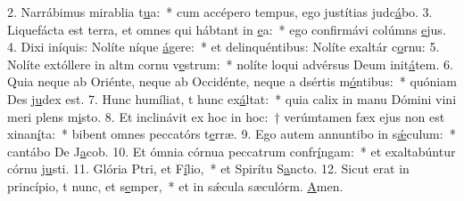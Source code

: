 2. Narrábimus mirablia t\uline{u}a:~* cum accépero tempus, ego justítias judc\uline{á}bo.
3. Liquefácta est terra, et omnes qui hábtant in \uline{e}a:~* ego confirmávi colúmns \uline{e}jus.
4. Dixi iníquis: Nolíte níque \uline{á}gere:~* et delinquéntibus: Nolíte exaltár c\uline{o}rnu:
5. Nolíte extóllere in altm cornu v\uline{e}strum:~* nolíte loqui advérsus Deum init\uline{á}tem.
6. Quia neque ab Oriénte, neque ab Occidénte, neque a dsértis m\uline{ó}ntibus:~* quóniam Des j\uline{u}dex est.
7. Hunc humíliat, t hunc ex\uline{á}ltat:~* quia calix in manu Dómini vini meri plens m\uline{i}sto.
8. Et inclinávit ex hoc in hoc:~† verúmtamen fæx ejus non est xinan\uline{í}ta:~* bibent omnes peccatórs t\uline{e}rræ.
9. Ego autem annuntibo in s\uline{ǽ}culum:~* cantábo De J\uline{a}cob.
10. Et ómnia córnua peccatrum confr\uline{í}ngam:~* et exaltabúntur córnu j\uline{u}sti.
11. Glória Ptri, et F\uline{í}lio,~* et Spirítu S\uline{a}ncto.
12. Sicut erat in princípio, t nunc, et s\uline{e}mper,~* et in sǽcula sæculórm. \uline{A}men.
